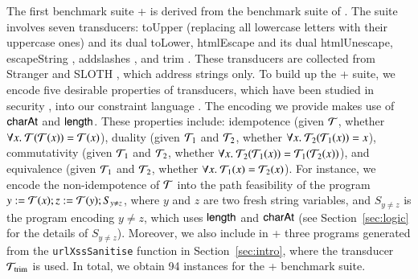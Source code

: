 The first benchmark suite {\transducerbench+} is derived from the {\transducerbench} benchmark suite of {\ostrich} \cite{CHL+19}.  The {\transducerbench} suite involves seven transducers: toUpper (replacing all lowercase letters with their uppercase ones) and its dual toLower, htmlEscape \cite{htmlEscape} and its dual htmlUnescape, escapeString \cite{escapeString}, addslashes \cite{addslashes}, and trim \cite{trim}. These transducers are collected from Stranger \cite{YABI14} and SLOTH \cite{HJLRV18}, which address strings only. To build up the {\transducerbench+} suite, %
we encode five desirable properties of transducers, which have been studied in security \cite{BEK}, into our constraint language {\slint}. The encoding we provide makes use of $\mathsf{charAt}$ and $\mathsf{length}$. These properties include: idempotence (given $\mathcal{T}$, whether $\forall x.\ \mathcal{T}(\mathcal{T}(x)) = \mathcal{T}(x)$), duality (given $\mathcal{T}_1$ and $\mathcal{T}_2$, whether $\forall x.\ \mathcal{T}_2(\mathcal{T}_1(x)) = x$), commutativity (given $\mathcal{T}_1$ and $\mathcal{T}_2$, whether $\forall x.\ \mathcal{T}_2(\mathcal{T}_1(x)) = \mathcal{T}_1(\mathcal{T}_2(x))$), and equivalence (given $\mathcal{T}_1$ and $\mathcal{T}_2$, whether $\forall x.\ \mathcal{T}_1(x) = \mathcal{T}_2(x)$).
%
For instance, we encode the non-idempotence of $\mathcal{T}$ into the path feasibility of the {\slint} program $y:=\mathcal{T}(x); z:=\mathcal{T}(y); S_{y \neq z}$, where $y$ and $z$ are two fresh string variables, and $S_{y \neq z}$ is the {\slint} program encoding $y \neq z$, which uses $\mathsf{length}$ and $\mathsf{charAt}$ (see Section~\ref{sec:logic} for the details of $S_{y \neq z}$). Moreover, we also include in {\transducerbench+} three {\slint} programs generated from the {\tt urlXssSanitise} function in Section~\ref{sec:intro}, %
where the transducer $\mathcal{T}_{\rm trim}$ is used. In total, we obtain 94 instances for the {\transducerbench+} benchmark suite. 
%
